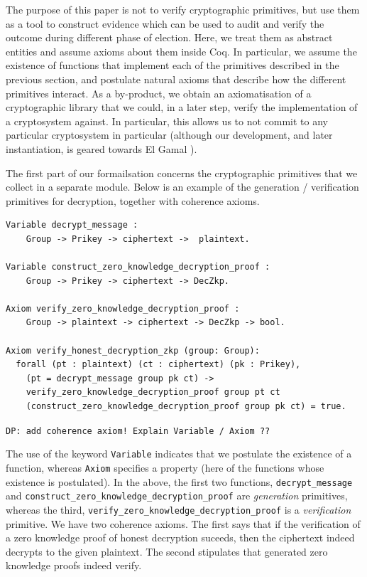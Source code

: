 \documentclass{llncs}
\begin{document}
The purpose of this paper is not to verify cryptographic primitives, 
but use them as a tool to construct evidence which can be used 
to audit and verify the outcome during different phase 
of election. Here, we treat them as abstract entities and assume
axioms about them inside Coq.
In particular, we assume the existence of functions that implement
each of the primitives described in the previous section, and
postulate natural axioms that describe how the different primitives
interact. As a by-product, we obtain an axiomatisation of a
cryptographic library that we could, in a later step, verify the
implementation of a cryptosystem against.  In particular, this
allows us to not commit to any particular cryptosystem in particular
(although our development, and later instantiation, is geared
towards El Gamal \cite{DBLP:conf/crypto/Gamal84}).

The first part of our formailsation concerns the cryptographic
primitives that we collect in a separate module. Below is an example
of the generation / verification primitives for decryption, together
with coherence axioms.
\begin{lstlisting}[frame=single,basicstyle=\ttfamily\footnotesize]
Variable decrypt_message : 
    Group -> Prikey -> ciphertext ->  plaintext.

Variable construct_zero_knowledge_decryption_proof :
    Group -> Prikey -> ciphertext -> DecZkp.

Axiom verify_zero_knowledge_decryption_proof :
    Group -> plaintext -> ciphertext -> DecZkp -> bool.

Axiom verify_honest_decryption_zkp (group: Group):
  forall (pt : plaintext) (ct : ciphertext) (pk : Prikey),
    (pt = decrypt_message group pk ct) ->
    verify_zero_knowledge_decryption_proof group pt ct 
    (construct_zero_knowledge_decryption_proof group pk ct) = true.
\end{lstlisting}

{\tt DP: add coherence axiom! Explain Variable / Axiom ??}
    
The use of the keyword \texttt{Variable} indicates that we postulate
the existence of a function, whereas \texttt{Axiom} specifies a
property (here of the functions whose existence is postulated). In
the above, the first two functions, \texttt{decrypt\_message} and
\texttt{construct\_zero\_knowledge\_decryption\_proof} are
\emph{generation} primitives, whereas the third,
\texttt{verify\_zero\_knowledge\_decryption\_proof} is a
\emph{verification} primitive. We have two coherence axioms. The
first says that if the verification of a zero knowledge proof of
honest decryption suceeds, then the ciphertext indeed decrypts to
the given plaintext. The second stipulates that generated zero
knowledge proofs indeed verify. 
\end{document}
